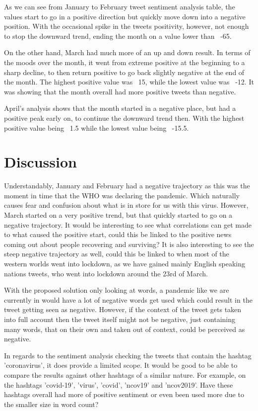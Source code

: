 \documentclass[a4paper,10pt]{article}
\begin{document}
As we can see from January to February tweet sentiment analysis table, the values start to go in a positive direction but quickly move down into a negative position. With the occasional spike in the tweets positivity, however, not enough to stop the downward trend, ending the month on a value lower than ~-65. 

On the other hand, March had much more of an up and down result. In terms of the moods over the month, it went from extreme positive at the beginning to a sharp decline, to then return positive to go back slightly negative at the end of the month. The highest positive value was ~15, while the lowest value was ~-12. It was showing that the month overall had more positive tweets than negative.

April's analysis shows that the month started in a negative place, but had a positive peak early on, to continue the downward trend then. With the highest positive value being ~1.5 while the lowest value being ~-15.5.

\section{Discussion}

Understandably, January and February had a negative trajectory as this was the moment in time that the WHO was declaring the pandemic. Which naturally causes fear and confusion about what is in store for us with this virus. However, March started on a very positive trend, but that quickly started to go on a negative trajectory. It would be interesting to see what correlations can get made to what caused the positive start, could this be linked to the positive news coming out about people recovering and surviving? It is also interesting to see the steep negative trajectory as well, could this be linked to when most of the western worlds went into lockdown, as we have gained mainly English speaking nations tweets, who went into lockdown around the 23rd of March.

With the proposed solution only looking at words, a pandemic like we are currently in would have a lot of negative words get used which could result in the tweet getting seen as negative. However, if the context of the tweet gets taken into full account then the tweet itself might not be negative, just containing many words, that on their own and taken out of context, could be perceived as negative.

In regards to the sentiment analysis checking the tweets that contain the hashtag 'coronavirus', it does provide a limited scope. It would be good to be able to compare the results against other hashtags of a similar nature. For example, on the hashtags 'covid-19', 'virus', 'covid', 'ncov19' and 'ncov2019'. Have these hashtags overall had more of positive sentiment or even been used more due to the smaller size in word count?
\end{document}
